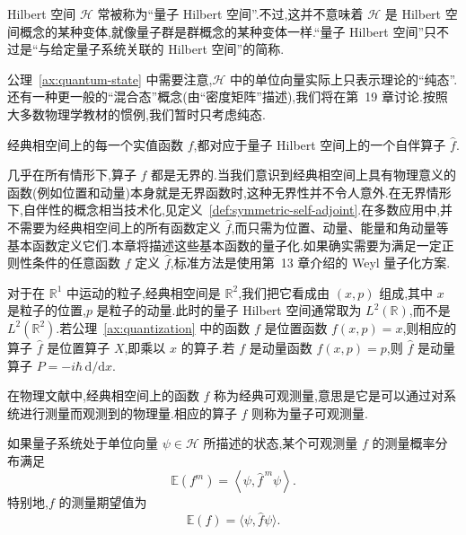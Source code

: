 Hilbert 空间 \(\mathcal{H}\) 常被称为“量子 Hilbert 空间”.不过,这并不意味着 \(\mathcal{H}\) 是 Hilbert 空间概念的某种变体,就像量子群是群概念的某种变体一样.“量子 Hilbert 空间”只不过是“与给定量子系统关联的 Hilbert 空间”的简称.

公理~\ref{ax:quantum-state} 中需要注意,\(\mathcal{H}\) 中的单位向量实际上只表示理论的“纯态”.还有一种更一般的“混合态”概念(由“密度矩阵”描述),我们将在第~19 章讨论.按照大多数物理学教材的惯例,我们暂时只考虑纯态.

\begin{axiom}[公理 2:量子化]\label{ax:quantization}
经典相空间上的每一个实值函数 \(f\),都对应于量子 Hilbert 空间上的一个自伴算子 \(\widehat{f}\).
\end{axiom}

几乎在所有情形下,算子 \(\widehat{f}\) 都是无界的.当我们意识到经典相空间上具有物理意义的函数(例如位置和动量)本身就是无界函数时,这种无界性并不令人意外.在无界情形下,自伴性的概念相当技术化,见定义~\ref{def:symmetric-self-adjoint}.在多数应用中,并不需要为经典相空间上的所有函数定义 \(\widehat{f}\),而只需为位置、动量、能量和角动量等基本函数定义它们.本章将描述这些基本函数的量子化.如果确实需要为满足一定正则性条件的任意函数 \(f\) 定义 \(\widehat{f}\),标准方法是使用第~13 章介绍的 Weyl 量子化方案.

对于在 \(\mathbb{R}^{1}\) 中运动的粒子,经典相空间是 \(\mathbb{R}^{2}\),我们把它看成由 \((x,p)\) 组成,其中 \(x\) 是粒子的位置,\(p\) 是粒子的动量.此时的量子 Hilbert 空间通常取为 \(L^{2}(\mathbb{R})\),而不是 \(L^{2}(\mathbb{R}^{2})\).若公理~\ref{ax:quantization} 中的函数 \(f\) 是位置函数 \(f(x,p)=x\),则相应的算子 \(\widehat f\) 是位置算子 \(X\),即乘以 \(x\) 的算子.若 \(f\) 是动量函数 \(f(x,p)=p\),则 \(\widehat f\) 是动量算子 \(P=-i\hbar\,\mathrm{d}/\mathrm{d}x\).

在物理文献中,经典相空间上的函数 \(f\) 称为经典可观测量,意思是它是可以通过对系统进行测量而观测到的物理量.相应的算子 \(\widehat f\) 则称为量子可观测量.

\begin{axiom}[公理 3:测量的矩]\label{ax:quantum-measurement}
如果量子系统处于单位向量 \(\psi\in\mathcal{H}\) 所描述的状态,某个可观测量 \(f\) 的测量概率分布满足
\begin{equation}
\mathbb{E}(f^{m})=\left\langle\psi,\widehat f^{\,m}\psi\right\rangle.
\label{eq:quantum-moments}
\end{equation}
特别地,\(f\) 的测量期望值为
\begin{equation}
\mathbb{E}(f)=\langle\psi,\widehat f\psi\rangle.
\label{eq:quantum-expectation}
\end{equation}
\end{axiom}

